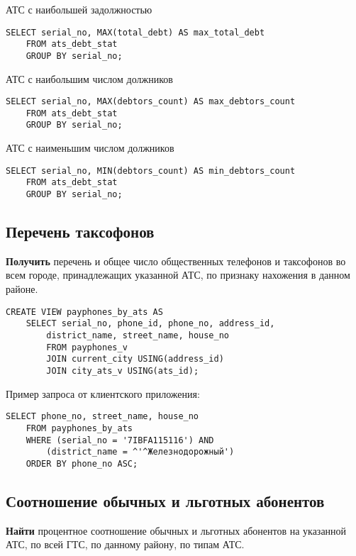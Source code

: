 \documentclass{report}
\begin{document}
АТС с наибольшей задолжностью

\begin{lstlisting}
SELECT serial_no, MAX(total_debt) AS max_total_debt
	FROM ats_debt_stat
	GROUP BY serial_no;
\end{lstlisting}

АТС с наибольшим числом должников

\begin{lstlisting}
SELECT serial_no, MAX(debtors_count) AS max_debtors_count
	FROM ats_debt_stat
	GROUP BY serial_no;
\end{lstlisting}

АТС с наименьшим числом должников

\begin{lstlisting}
SELECT serial_no, MIN(debtors_count) AS min_debtors_count
	FROM ats_debt_stat
	GROUP BY serial_no;
\end{lstlisting}

\subsection{Перечень таксофонов}

\textbf{Получить} перечень и общее число общественных телефонов и 
таксофонов во всем городе, принадлежащих указанной АТС, по признаку 
нахожения в данном районе.

\begin{lstlisting}
CREATE VIEW payphones_by_ats AS
    SELECT serial_no, phone_id, phone_no, address_id, 
        district_name, street_name, house_no
        FROM payphones_v
        JOIN current_city USING(address_id)
        JOIN city_ats_v USING(ats_id);
\end{lstlisting}

Пример запроса от клиентского приложения:

\begin{lstlisting}
SELECT phone_no, street_name, house_no
	FROM payphones_by_ats
	WHERE (serial_no = '7IBFA115116') AND
		(district_name = ^'^Железнодорожный')
	ORDER BY phone_no ASC;
\end{lstlisting}

\subsection{Соотношение обычных и льготных абонентов}

\textbf{Найти} процентное соотношение обычных и льготных абонентов 
на указанной АТС, по всей ГТС, по данному району, по типам АТС.
\end{document}

